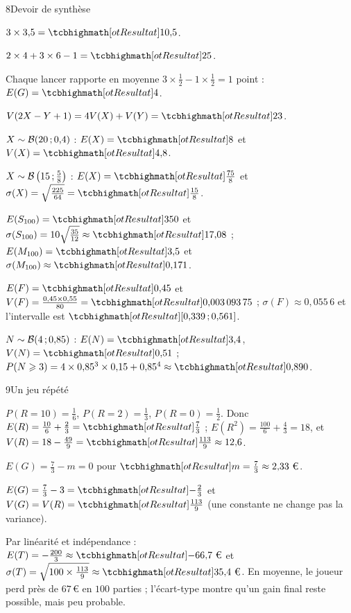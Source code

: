 \begin{corrige}{8}{Devoir de synthèse}
\begin{questions}
  \item $3\times3{,}5=\res{10{,}5}$.
  \item $2\times4+3\times6-1=\res{25}$.
  \item Chaque lancer rapporte en moyenne $3\times\frac12-1\times\frac12=1$ point : $E(G)=\res{4}$.
  \item $V(2X-Y+1)=4V(X)+V(Y)=\res{23}$.
  \item $X\sim\mathcal{B}(20\,{;}\,0{,}4)$ : $E(X)=\res{8}$ et $V(X)=\res{4{,}8}$.
  \item $X\sim\mathcal{B}\left(15\,{;}\,\frac58\right)$ : $E(X)=\res{\frac{75}{8}}$ et $\sigma(X)=\sqrt{\frac{225}{64}}=\res{\frac{15}{8}}$.
  \item $E(S_{100})=\res{350}$ et $\sigma(S_{100})=10\sqrt{\frac{35}{12}}\approx\res{17{,}08}$ ; $E(M_{100})=\res{3{,}5}$ et $\sigma(M_{100})\approx\res{0{,}171}$.
  \item $E(F)=\res{0{,}45}$ et $V(F)=\frac{0{,}45\times0{,}55}{80}=\res{0{,}003\,093\,75}$ ; $\sigma(F)\approx0{,}055\,6$ et l'intervalle est $\res{\intFF{0{,}339}{0{,}561}}$.
  \item $N\sim\mathcal{B}(4\,{;}\,0{,}85)$ : $E(N)=\res{3{,}4}$, $V(N)=\res{0{,}51}$ ; $P(N\geq3)=4\times0{,}85^{3}\times0{,}15+0{,}85^{4}\approx\res{0{,}890}$.
\end{questions}
\end{corrige}

\begin{corrige}{9}{Un jeu répété}
\begin{questions}
  \item $P(R=10)=\frac16$, $P(R=2)=\frac13$, $P(R=0)=\frac12$. Donc $E(R)=\frac{10}{6}+\frac{2}{3}=\res{\frac73}$ ; $E\left(R^{2}\right)=\frac{100}{6}+\frac43=18$, et
    $V(R)=18-\frac{49}{9}=\res{\frac{113}{9}}\approx12{,}6$.
  \item $E(G)=\frac73-m=0$ pour $\res{m=\frac73\approx2{,}33\text{ €}}$.
  \item $E(G)=\frac73-3=\res{-\frac23}$ et $V(G)=V(R)=\res{\frac{113}{9}}$ (une constante ne change pas la variance).
  \item Par linéarité et indépendance : $E(T)=-\frac{200}{3}\approx\res{-66{,}7\text{ €}}$ et $\sigma(T)=\sqrt{100\times\frac{113}{9}}\approx\res{35{,}4\text{ €}}$.
    En moyenne, le joueur perd près de $67$\,€ en $100$ parties ; l'écart-type montre qu'un gain final reste possible, mais peu probable.
\end{questions}
\end{corrige}

